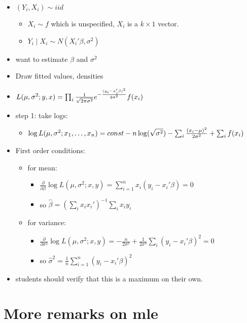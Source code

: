 \documentclass[11pt]{article}
\begin{document}
\begin{itemize}
\item $(Y_i,X_i) \sim iid$
\begin{itemize}
\item $X_i \sim f$ which is unspecified, $X_i$ is a $k\times1$ vector.
\item $Y_i \mid X_i \sim N(X_i'\beta, \sigma^2)$
\end{itemize}
\item want to estimate $\beta$ and $\sigma^2$
\item Draw fitted values, densities
\item $L(\mu,\sigma^2; y, x) = \prod_i {1 \over \sqrt{2 \pi \sigma^2}} e^{- {(y_i - x_i'\beta)^2 \over 2 \sigma^2}} f(x_i)$
\item step 1: take logs:
\begin{itemize}
\item $\log L(\mu,\sigma^2; x_1,\dots,x_n) = const - n\log
         (\sqrt{\sigma^2}) - \sum_i {(x_i - \mu)^2 \over 2 \sigma^2} + \sum_i f(x_i)$
\end{itemize}
\item First order conditions:
\begin{itemize}
\item for mean:
\begin{itemize}
\item $\frac{\partial}{\partial \beta} \log L(\mu, \sigma^2; x, y) = \sum_{i=1}^n x_i (y_i - x_i'\beta) = 0$
\item so $\hat\beta=(\sum_i x_i x_i')^{-1} \sum_i x_i y_i$
\end{itemize}
\item for variance:
\begin{itemize}
\item $\frac{\partial}{\partial \sigma^2} \log L(\mu, \sigma^2; x, y) = -\frac{n}{2\sigma^2} + \frac{1}{2 \sigma^4}\sum_i (y_i - x_i'\beta)^2 = 0$
\item so $\hat\sigma^2 = \frac{1}{n} \sum_{i=1}^n (y_i - x_i'\beta)^2$
\end{itemize}
\end{itemize}
\item students should verify that this is a maximum on their own.
\end{itemize}
\section{More remarks on mle}
\label{sec-4}
\end{document}
